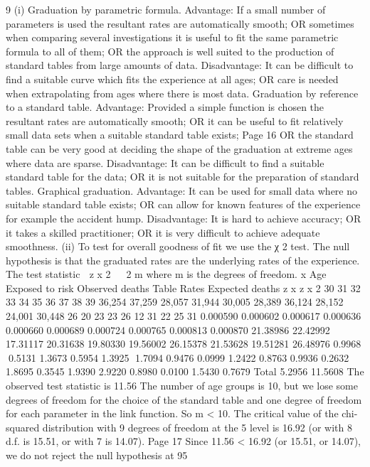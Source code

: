 \documentclass[a4paper,12pt]{article}
\begin{document}
\begin{enumerate}
9
(i)
Graduation by parametric formula.
Advantage: If a small number of parameters is used the resultant rates are
automatically smooth;
OR sometimes when comparing several investigations it is useful to fit the same
parametric formula to all of them;
OR the approach is well suited to the production of standard tables from large
amounts of data.
Disadvantage: It can be difficult to find a suitable curve which fits the experience at
all ages;
OR care is needed when extrapolating from ages where there is most data.
Graduation by reference to a standard table.
Advantage: Provided a simple function is chosen the resultant rates are automatically
smooth;
OR it can be useful to fit relatively small data sets when a suitable standard table
exists;
Page 16%
OR the standard table can be very good at deciding the shape of the graduation at
extreme ages where data are sparse.
Disadvantage: It can be difficult to find a suitable standard table for the data;
OR it is not suitable for the preparation of standard tables.
Graphical graduation.
Advantage: It can be used for small data where no suitable standard table exists;
OR can allow for known features of the experience for example the accident hump.
Disadvantage: It is hard to achieve accuracy;
OR it takes a skilled practitioner;
OR it is very difficult to achieve adequate smoothness.
(ii)
To test for overall goodness of fit we use the χ 2 test.
The null hypothesis is that the graduated rates are the underlying rates of the
experience.
The test statistic  z x 2   2 m where m is the degrees of freedom.
x
Age Exposed
to risk Observed
deaths Table
Rates Expected
deaths z x z x 2
30
31
32
33
34
35
36
37
38
39 36,254
37,259
28,057
31,944
30,005
28,389
36,124
28,152
24,001
30,448 26
20
23
23
26
12
31
22
25
31 0.000590
0.000602
0.000617
0.000636
0.000660
0.000689
0.000724
0.000765
0.000813
0.000870 21.38986
22.42992
17.31117
20.31638
19.80330
19.56002
26.15378
21.53628
19.51281
26.48976 0.9968
0.5131
1.3673
0.5954
1.3925
1.7094
0.9476
0.0999
1.2422
0.8763 0.9936
0.2632
1.8695
0.3545
1.9390
2.9220
0.8980
0.0100
1.5430
0.7679
Total 5.2956 11.5608
The observed test statistic is 11.56
The number of age groups is 10, but we lose some degrees of freedom for the choice
of the standard table and one degree of freedom for each parameter in the link
function. So m < 10.
The critical value of the chi-squared distribution with 9 degrees of freedom at the 5%
level is 16.92 (or with 8 d.f. is 15.51, or with 7 is 14.07).
Page 17%
Since 11.56 < 16.92 (or 15.51, or 14.07), we do not reject the null hypothesis at 95%

\end{enumerate}
\end{document}
